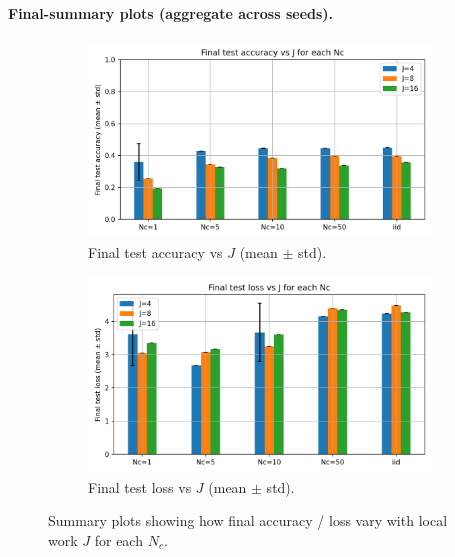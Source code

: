 \documentclass[10pt,twocolumn,letterpaper]{article}
\begin{document}
\paragraph{Final-summary plots (aggregate across seeds).}
\begin{figure}[H]
  \centering
  \begin{subfigure}[b]{0.48\linewidth}
    \centering
    \includegraphics[width=\linewidth]{heter_figs/final_acc_vs_j.png}
    \caption{Final test accuracy vs \(J\) (mean \(\pm\) std).}
    \label{fig:hetero-final-acc}
  \end{subfigure}
  \hfill
  \begin{subfigure}[b]{0.48\linewidth}
    \centering
    \includegraphics[width=\linewidth]{heter_figs/final_loss_vs_j.png}
    \caption{Final test loss vs \(J\) (mean \(\pm\) std).}
    \label{fig:hetero-final-loss}
  \end{subfigure}
  \caption{Summary plots showing how final accuracy / loss vary with local work \(J\) for each \(N_c\).}
  \label{fig:hetero-final-summary}
\end{figure}
\end{document}
